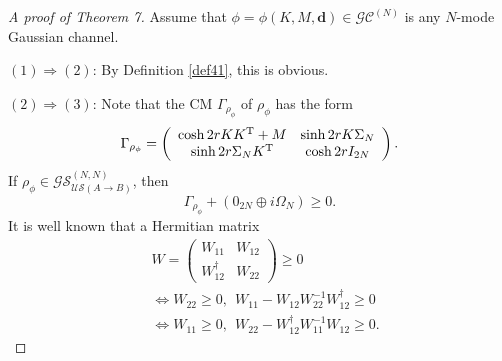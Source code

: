 \documentclass[10pt,aps,pra,amsfonts,amssymb,amsmath,%
floatfix,nofootinbib, groupedaddress,superscriptaddress,citesort,twocolumn
]{revtex4}%
\begin{document}
\begin{proof}[A proof of Theorem 7]	Assume that $\phi=\phi \left( {K,M,\mathbf d} \right) \in {\mathcal {GC}}^{\left(N\right)}$ is any $N$-mode Gaussian channel.
	
	$\left( 1 \right) \Rightarrow \left( 2 \right)$:  By Definition \ref{def41}, this is obvious.
	
	$\left( 2 \right) \Rightarrow \left( 3 \right)$:
Note that  the CM $\Gamma _{{\rho _\phi }}$    of ${\rho _\phi }$ has the form \cite{X11}
	\begin{eqnarray*}\label{Choi}
		{\Gamma _{{\rho _\phi }}} = \left( {\begin{array}{*{20}{c}}
				{\cosh2r K{K^{\rm T}} + M}&{\sinh2r K\Sigma_{N}  }\\
				{\sinh2r\Sigma_{N} {{K^{\rm T}}} }&{\cosh2rI_{2N}}
		\end{array}} \right).
	\end{eqnarray*}		
 If  $ {\rho _\phi } \in {\mathcal {GS}}^{(N,N)}_{\mathcal {US}(A \rightarrow B)}$, then 
	\begin{equation}\label{NN}
		\Gamma _{{\rho _\phi }} + ( 0_{2N} \oplus i{\Omega_{N} }) \ge 0.
	\end{equation}			
	It is well known \cite{ZH} that  a Hermitian matrix  
	\begin{eqnarray}\label{ZH}
	&	W=\left(\begin{array}{cc}W_{11}& W_{12}\\
			W_{12}^{\dag} & W_{22}\end{array}\right)\ge 0 \\ \nonumber
			 &\Leftrightarrow W_{22}\ge 0,\ \ W_{11}-W_{12}W_{22}^{-1}W_{12}^{\dag}\ge0\\\nonumber
		&\Leftrightarrow W_{11}\ge 0,\ \ W_{22}-W_{12}^{\dag}W_{11}^{-1}W_{12}\ge0.
		\end{eqnarray}
		

\end{proof}
\end{document}
